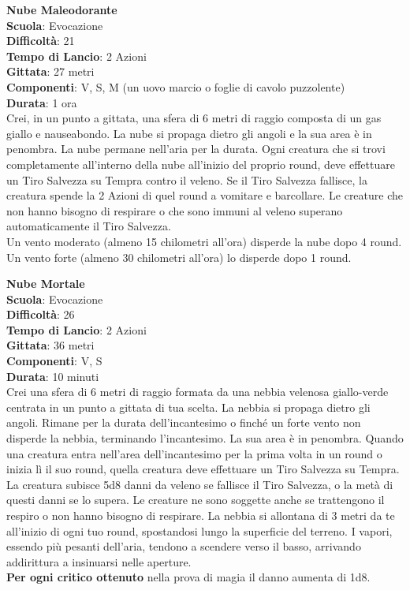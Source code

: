 \begin{multicols}{2}
\medskip\textbf{Nube Maleodorante}\\
\textbf{Scuola}: Evocazione\\
\textbf{Difficoltà}: 21\\
\textbf{Tempo di Lancio}: 2 Azioni\\
\textbf{Gittata}: 27 metri\\
\textbf{Componenti}: V, S, M (un uovo marcio o foglie di cavolo puzzolente)\\
\textbf{Durata}: 1 ora\\
Crei, in un punto a gittata, una sfera di 6 metri di raggio composta di un gas giallo e nauseabondo. La nube si propaga dietro gli angoli e la sua area è in penombra. La nube permane nell'aria per la durata. Ogni creatura che si trovi completamente all'interno della nube all'inizio del proprio round, deve effettuare un Tiro Salvezza su Tempra contro il veleno. Se il Tiro Salvezza fallisce, la creatura spende la 2 Azioni di quel round a vomitare e barcollare. Le creature che non hanno bisogno di respirare o che sono immuni al veleno superano automaticamente il Tiro Salvezza.\\
Un vento moderato (almeno 15 chilometri all'ora) disperde la nube dopo 4 round. Un vento forte (almeno 30 chilometri all'ora) lo disperde dopo 1 round.

\medskip\textbf{Nube Mortale}\\
\textbf{Scuola}: Evocazione\\
\textbf{Difficoltà}: 26\\
\textbf{Tempo di Lancio}: 2 Azioni\\
\textbf{Gittata}: 36 metri\\
\textbf{Componenti}: V, S\\
\textbf{Durata}: 10 minuti \\
Crei una sfera di 6 metri di raggio formata da una nebbia velenosa giallo-verde centrata in un punto a gittata di tua scelta. La nebbia si propaga dietro gli angoli. Rimane per la durata dell'incantesimo o finché un forte vento non disperde la nebbia, terminando l'incantesimo. La sua area è in penombra. Quando una creatura entra nell'area dell'incantesimo per la prima volta in un round o inizia lì il suo round, quella creatura deve effettuare un Tiro Salvezza su Tempra. La creatura subisce 5d8 danni da veleno se fallisce il Tiro Salvezza, o la metà di questi danni se lo supera. Le creature ne sono soggette anche se trattengono il respiro o non hanno bisogno di respirare. La nebbia si allontana di 3 metri da te all'inizio di ogni tuo round, spostandosi lungo la superficie del terreno. I vapori, essendo più pesanti dell'aria, tendono a scendere verso il basso, arrivando addirittura a insinuarsi nelle aperture.\\
\textbf{Per ogni critico ottenuto} nella prova di magia il danno aumenta di 1d8.


\end{multicols}

